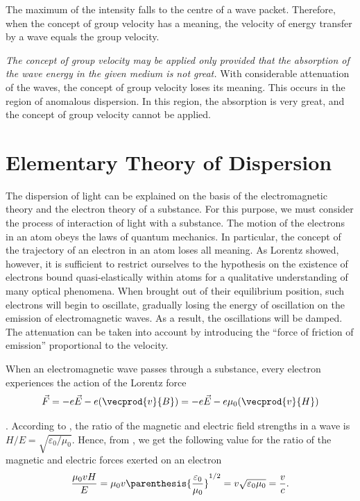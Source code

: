 The maximum of the intensity falls to the centre of a wave packet.
Therefore, when the concept of group velocity has a meaning, the velocity of energy transfer by a wave equals the group velocity.

\textit{The concept of group velocity may be applied only provided that the absorption of the wave energy in the given medium is not great.}
With considerable attenuation of the waves, the concept of group velocity loses its meaning.
This occurs in the region of anomalous dispersion.
In this region, the absorption is very great, and the concept of group velocity cannot be applied.

\section{Elementary Theory of Dispersion}\label{sec:20_3}

The dispersion of light can be explained on the basis of the electromagnetic theory and the electron theory of a substance.
For this purpose, we must consider the process of interaction of light with a substance.
The motion of the electrons in an atom obeys the laws of quantum mechanics.
In particular, the concept of the trajectory of an electron in an atom loses all meaning.
As Lorentz showed, however, it is sufficient to restrict ourselves to the hypothesis on the existence of electrons bound quasi-elastically within atoms for a qualitative understanding of many optical phenomena.
When brought out of their equilibrium position, such electrons will begin to oscillate, gradually losing the energy of oscillation on the emission of electromagnetic waves.
As a result, the oscillations will be damped.
The attenuation can be taken into account by introducing the ``force of friction of emission'' proportional to the velocity.

When an electromagnetic wave passes through a substance, every electron experiences the action of the Lorentz force
\begin{equation}\label{eq:20_18}
	\vec{F} = -e \vec{E} - e (\vecprod{v}{B}) = -e \vec{E} - e\mu_0 (\vecprod{v}{H})
\end{equation}

.
According to , the ratio of the magnetic and electric field strengths in a wave is $H/E = \sqrt{\varepsilon_0/\mu_0}$.
Hence, from , we get the following value for the ratio of the magnetic and electric forces exerted on an electron
\begin{equation*}
	\frac{\mu_0 v H}{E} = \mu_0 v \parenthesis{\frac{\varepsilon_0}{\mu_0}}^{1/2} = v \sqrt{\varepsilon_0\mu_0} = \frac{v}{c}.
\end{equation*}

